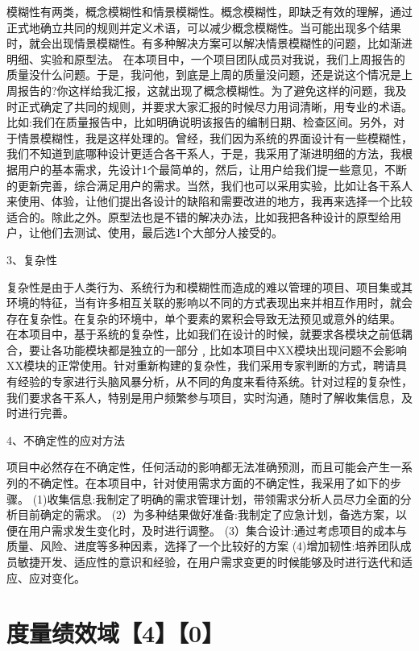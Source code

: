 \documentclass[UTF8]{../computerUniverse}
\begin{document}
模糊性有两类，概念模糊性和情景模糊性。概念模糊性，即缺乏有效的理解，通过正式地确立共同的规则并定义术语，可以减少概念模糊性。当可能出现多个结果时，就会出现情景模糊性。有多种解决方案可以解决情景模糊性的问题，比如渐进明细、实验和原型法。
在本项目中，一个项目团队成员对我说，我们上周报告的质量没什么问题。于是，我问他，到底是上周的质量没问题，还是说这个情况是上周报告的?你这样给我汇报，这就出现了概念模糊性。为了避免这样的问题，我及时正式确定了共同的规则，并要求大家汇报的时候尽力用词清晰，用专业的术语。比如:我们在质量报告中，比如明确说明该报告的编制日期、检查区间。另外，对于情景模糊性，我是这样处理的。曾经，我们因为系统的界面设计有一些模糊性，我们不知道到底哪种设计更适合各干系人，于是，我采用了渐进明细的方法，我根据用户的基本需求，先设计1个最简单的，然后，让用户给我们提一些意见，不断的更新完善，综合满足用户的需求。当然，我们也可以采用实验，比如让各干系人来使用、体验，让他们提出各设计的缺陷和需要改进的地方，我再来选择一个比较适合的。除此之外。原型法也是不错的解决办法，比如我把各种设计的原型给用户，让他们去测试、使用，最后选1个大部分人接受的。



3、复杂性

复杂性是由于人类行为、系统行为和模糊性而造成的难以管理的项目、项目集或其环境的特征，当有许多相互关联的影响以不同的方式表现出来并相互作用时，就会存在复杂性。在复杂的环境中，单个要素的累积会导致无法预见或意外的结果。
在本项目中，基于系统的复杂性，比如我们在设计的时候，就要求各模块之前低耦合，要让各功能模块都是独立的一部分﹐比如本项目中XX模块出现问题不会影响XX模块的正常使用。针对重新构建的复杂性，我们采用专家判断的方式，聘请具有经验的专家进行头脑风暴分析，从不同的角度来看待系统。针对过程的复杂性，我们要求各干系人，特别是用户频繁参与项目，实时沟通，随时了解收集信息，及时进行完善。


4、不确定性的应对方法

项目中必然存在不确定性，任何活动的影响都无法准确预测，而且可能会产生一系列的不确定性。在本项目中，针对使用需求方面的不确定性，我采用了如下的步骤。
(1)收集信息:我制定了明确的需求管理计划，带领需求分析人员尽力全面的分析目前确定的需求。
(2）为多种结果做好准备:我制定了应急计划，备选方案，以便在用户需求发生变化时，及时进行调整。
(3）集合设计:通过考虑项目的成本与质量、风险、进度等多种因素，选择了一个比较好的方案
(4)增加韧性:培养团队成员敏捷开发、适应性的意识和经验，在用户需求变更的时候能够及时进行迭代和适应、应对变化。




\chapter{度量绩效域【4】【0】}
\end{document}
